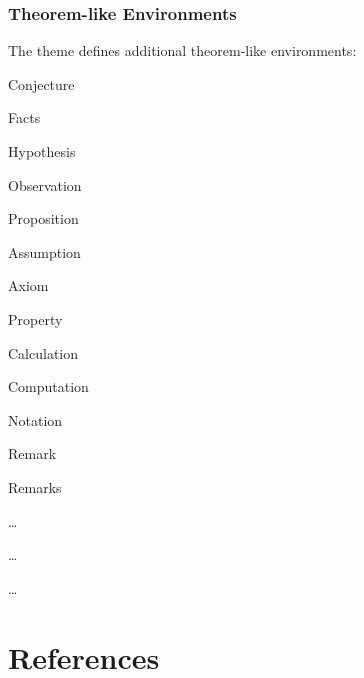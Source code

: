 \documentclass[9pt]{beamer}
\begin{document}
\begin{frame}
  \frametitle{Theorem-like Environments}

  The theme defines additional theorem-like environments:

  \vspace{2ex}

  \begin{itemize}
    \begin{minipage}{.45\linewidth}
      \item Conjecture
      \item Facts
      \item Hypothesis
      \item Observation
      \item Proposition
      \item Assumption
      \item Axiom
    \end{minipage}
    \begin{minipage}{.45\linewidth}
      \item Property
      \item Calculation
      \item Computation
      \item Notation
      \item Remark
      \item Remarks
    \end{minipage}
  \end{itemize}

  \begin{notation}
    \ldots
  \end{notation}

  \begin{axiom}
    \ldots
  \end{axiom}

  \begin{property}
    \ldots
  \end{property}

\end{frame}

\showlogo

\section{References}
\end{document}
